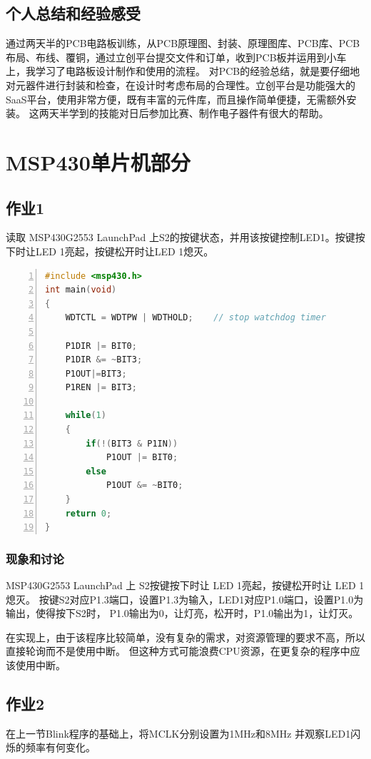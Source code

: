 \documentclass[a4paper,twoside,zihao=5,UTF8]{ctexart}
\begin{document}
\begin{spacing}{1.2}
\subsection{个人总结和经验感受}

通过两天半的PCB电路板训练，从PCB原理图、封装、原理图库、PCB库、PCB布局、布线、覆铜，通过立创平台提交文件和订单，收到PCB板并运用到小车上，我学习了电路板设计制作和使用的流程。
对PCB的经验总结，就是要仔细地对元器件进行封装和检查，在设计时考虑布局的合理性。立创平台是功能强大的SaaS平台，使用非常方便，既有丰富的元件库，而且操作简单便捷，无需额外安装。
这两天半学到的技能对日后参加比赛、制作电子器件有很大的帮助。

\section{MSP430单片机部分}

\subsection{作业1}
读取 MSP430G2553 LaunchPad 上S2的按键状态，并用该按键控制LED1。按键按下时让LED 1亮起，按键松开时让LED 1熄灭。

\begin{lstlisting}[language=c++,numbers=left,style=CppStyle,caption=作业1,label={code:p1}]
#include <msp430.h> 
int main(void)
{
    WDTCTL = WDTPW | WDTHOLD;    // stop watchdog timer

    P1DIR |= BIT0;
    P1DIR &= ~BIT3;
    P1OUT|=BIT3;
    P1REN |= BIT3;

    while(1)
    {
        if(!(BIT3 & P1IN))
            P1OUT |= BIT0;
        else
            P1OUT &= ~BIT0;
    }
    return 0;
}
\end{lstlisting}

\subsubsection{现象和讨论}
MSP430G2553 LaunchPad 上 S2按键按下时让 LED 1亮起，按键松开时让 LED 1熄灭。
按键S2对应P1.3端口，设置P1.3为输入，LED1对应P1.0端口，设置P1.0为输出，使得按下S2时，
P1.0输出为0，让灯亮，松开时，P1.0输出为1，让灯灭。

在实现上，由于该程序比较简单，没有复杂的需求，对资源管理的要求不高，所以直接轮询而不是使用中断。
但这种方式可能浪费CPU资源，在更复杂的程序中应该使用中断。

\subsection{作业2}
在上一节Blink程序的基础上，将MCLK分别设置为1MHz和8MHz
并观察LED1闪烁的频率有何变化。


\end{spacing}
\end{document}
